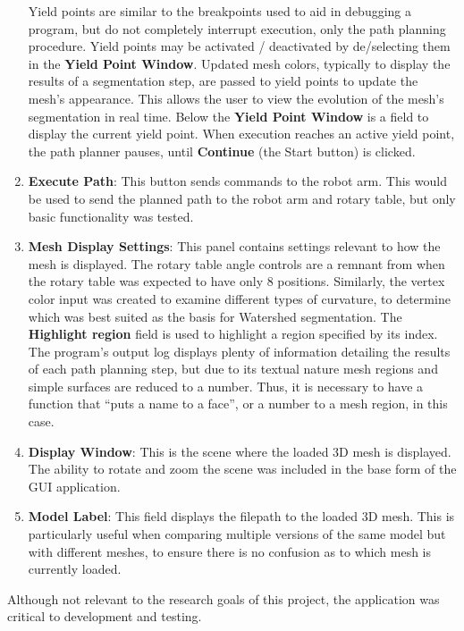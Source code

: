 \begin{enumerate}
		Yield points are similar to the breakpoints used to aid in debugging a program, but do not completely interrupt execution, only the path planning procedure.
		Yield points may be activated / deactivated by de/selecting them in the \textbf{Yield Point Window}.
		Updated mesh colors, typically to display the results of a segmentation step, are passed to yield points to update the mesh's appearance.
		This allows the user to view the evolution of the mesh's segmentation in real time.
		Below the \textbf{Yield Point Window} is a field to display the current yield point.
		When execution reaches an active yield point, the path planner pauses, until \textbf{Continue} (the Start button) is clicked.
	\item \textbf{Execute Path}: This button sends commands to the robot arm.
		This would be used to send the planned path to the robot arm and rotary table, but only basic functionality was tested.
	\item \textbf{Mesh Display Settings}: This panel contains settings relevant to how the mesh is displayed.
		The rotary table angle controls are a remnant from when the rotary table was expected to have only 8 positions.
		Similarly, the vertex color input was created to examine different types of curvature, to determine which was best suited as the basis for Watershed segmentation.
		The \textbf{Highlight region} field is used to highlight a region specified by its index.
		The program's output log displays plenty of information detailing the results of each path planning step, but due to its textual nature mesh regions and simple surfaces are reduced to a number.
		Thus, it is necessary to have a function that ``puts a name to a face'', or a number to a mesh region, in this case.
	\item \textbf{Display Window}: This is the scene where the loaded 3D mesh is displayed.
		The ability to rotate and zoom the scene was included in the base form of the GUI application.
	\item \textbf{Model Label}: This field displays the filepath to the loaded 3D mesh.
		This is particularly useful when comparing multiple versions of the same model but with different meshes, to ensure there is no confusion as to which mesh is currently loaded.
\end{enumerate}

Although not relevant to the research goals of this project, the application was critical to development and testing.

